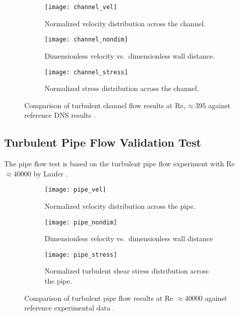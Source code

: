\begin{figure}[htb!]
  \centering
  \begin{subfigure}[b]{0.48\columnwidth}
    \centering
    \texttt{[image: channel\_vel]}
    \caption{Normalized velocity distribution across the channel.}
    \label{fig:}
  \end{subfigure}
  \hfill
  \begin{subfigure}[b]{0.48\columnwidth}
    \centering
    \texttt{[image: channel\_nondim]}
    \caption{Dimensionless velocity vs.\ dimensionless wall distance.}
    \label{fig:}
  \end{subfigure}
  \begin{subfigure}[b]{0.48\columnwidth}
    \centering
    \texttt{[image: channel\_stress]}
    \caption{Normalized stress distribution across the channel.}
    \label{fig:}
  \end{subfigure}
  \caption{Comparison of turbulent channel flow results at Re$_\tau\approx395$ against reference
  \gls{DNS} results \cite{moser_direct_1999}.}
  \label{fig:}
\end{figure}

\subsection{Turbulent Pipe Flow Validation Test}

The pipe flow test is based on the turbulent pipe flow experiment with Re $\approx 40000$ by
Laufer \cite{laufer_structure_1954}.

\begin{figure}[htb]
  \centering
  \begin{subfigure}[b]{0.48\columnwidth}
    \centering
    \texttt{[image: pipe\_vel]}
    \caption{Normalized velocity distribution across the pipe.}
    \label{fig:}
  \end{subfigure}
  \hfill
  \begin{subfigure}[b]{0.48\columnwidth}
    \centering
    \texttt{[image: pipe\_nondim]}
    \caption{Dimensionless velocity vs.\ dimensionless wall distance}
    \label{fig:}
  \end{subfigure}
  \begin{subfigure}[b]{0.48\columnwidth}
    \centering
    \texttt{[image: pipe\_stress]}
    \caption{Normalized turbulent shear stress distribution across the pipe.}
    \label{fig:}
  \end{subfigure}
  \caption{Comparison of turbulent pipe flow results at Re $\approx 40000$ against reference
  experimental data \cite{laufer_structure_1954}.}
\end{figure}

